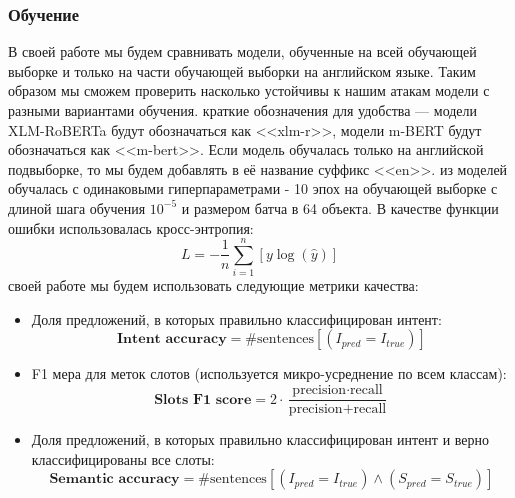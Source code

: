 \subsubsection{Обучение}\label{subsubsec:model_name}
В своей работе мы будем сравнивать модели, обученные на всей обучающей выборке и только на части обучающей выборки на английском языке.
Таким образом мы сможем проверить насколько устойчивы к нашим атакам модели с разными вариантами обучения.
 краткие обозначения для удобства — модели XLM-RoBERTa будут обозначаться как <<xlm-r>>, модели m-BERT будут обозначаться как <<m-bert>>.
Если модель обучалась только на английской подвыборке, то мы будем добавлять в её название суффикс <<en>>.
 из моделей обучалась с одинаковыми гиперпараметрами - 10 эпох на обучающей выборке с длиной шага обучения $10^{-5}$ и размером батча в 64 объекта.
В качестве функции ошибки использовалась кросс-энтропия:
\begin{equation}
    L = -\dfrac{1}{n}\sum\limits_{i = 1}^{n}\left[ y\log\left(\hat{y}\right) \right]\label{eq:equation4}
\end{equation}
 своей работе мы будем использовать следующие метрики качества:
\begin{itemize}
    \item Доля предложений, в которых правильно классифицирован интент:
    \begin{equation}
        \textbf{Intent accuracy} = \# \text{sentences} \left[ \left(I_{pred} = I_{true} \right) \right]\label{eq:equation}
    \end{equation}
    \item F1 мера для меток слотов (используется микро-усреднение по всем классам):
    \begin{equation}
        \textbf{Slots F1 score} = 2 \cdot \dfrac{\text{precision} \cdot \text{recall}}{\text{precision} + \text{recall}}\label{eq:equation2}
    \end{equation}
    \item Доля предложений, в которых правильно классифицирован интент и верно классифицированы все слоты:
    \begin{equation}
        \textbf{Semantic accuracy} = \# \text{sentences} \left[ \left(I_{pred} = I_{true} \right) \land \left(S_{pred} = S_{true} \right)\right]\label{eq:equation3}
    \end{equation}
\end{itemize}

